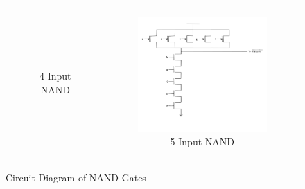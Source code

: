 \documentclass[conference]{IEEEtran}
\begin{document}
\begin{figure}[H]
\begin{tabular}{cc}
\begin{subfigure}{0.44\linewidth}
            \caption{4 Input NAND}
        \end{subfigure} &
        \begin{subfigure}{0.44\linewidth}
            \centering
            \includegraphics[width=\textwidth]{images/nand_5_cmos_circuit_diagram.png}
            \caption{5 Input NAND}
        \end{subfigure}
    \end{tabular}
    \caption{Circuit Diagram of NAND Gates}
\end{figure}
\end{document}
